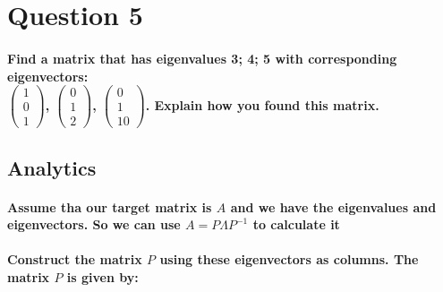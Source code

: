 \section{Question 5}
\paragraph{Find a matrix that has eigenvalues 3; 4; 5 with corresponding
    eigenvectors: \\
    $\begin{pmatrix}
            1 \\ 0 \\ 1
        \end{pmatrix}$,
    $\begin{pmatrix}
            0 \\ 1 \\ 2
        \end{pmatrix}$,
    $\begin{pmatrix}
            0 \\ 1 \\ 10
        \end{pmatrix}$.
    Explain how you found this matrix.
}
\subsection{Analytics}
\paragraph{Assume tha our target matrix is $A$ and we have the eigenvalues and eigenvectors. So we can use $A=P \Lambda P^{-1}$ to calculate it}
\paragraph{Construct the matrix \(P\) using these eigenvectors as columns. The matrix \(P\) is given by:}
% 
% 
% 
% 
% 
% 
% 
